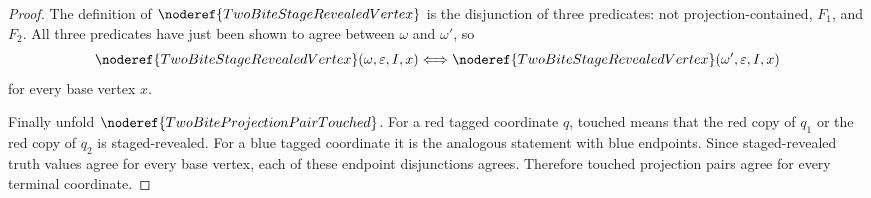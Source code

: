 \begin{proof}
The definition of \(\noderef{TwoBiteStageRevealedVertex}\) is the disjunction
of three predicates: not projection-contained, \(F_1\), and \(F_2\).  All
three predicates have just been shown to agree between \(\omega\) and
\(\omega'\), so
\[
\noderef{TwoBiteStageRevealedVertex}(\omega,\varepsilon,I,x)
\Longleftrightarrow
\noderef{TwoBiteStageRevealedVertex}(\omega',\varepsilon,I,x)
\]
for every base vertex \(x\).

Finally unfold \(\noderef{TwoBiteProjectionPairTouched}\).  For a red tagged
coordinate \(q\), touched means that the red copy of \(q_1\) or the red copy
of \(q_2\) is staged-revealed.  For a blue tagged coordinate it is the
analogous statement with blue endpoints.  Since staged-revealed truth values
agree for every base vertex, each of these endpoint disjunctions agrees.
Therefore touched projection pairs agree for every terminal coordinate.
\end{proof}
